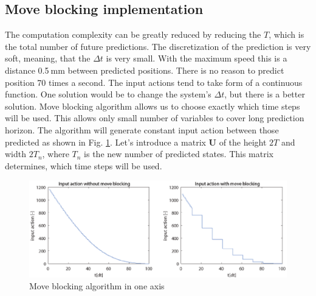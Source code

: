 \documentclass[a4paper,11pt,titlepage]{article}
\newcommand{\jed}[1]{\ensuremath{~\mathrm{#1}}}
\begin{document}
\subsection{Move blocking implementation}
The computation complexity can be greatly reduced by reducing the $T$, which is the total number of future predictions. The discretization of the prediction is very soft, meaning, that the $\Delta t$ is very small. With the maximum speed this is a distance 0.5\jed{mm} between predicted positions. There is no reason to predict position 70 times a second. The input actions tend to take form of a continuous function. One solution would be to change the system's $\Delta t$, but there is a better solution. Move blocking algorithm allows us to choose exactly which time steps will be used. This allows only small number of variables to cover long prediction horizon. The algorithm will generate constant input action between those predicted as shown in Fig. \ref{fig:move_blocking}. Let's introduce a matrix $\textbf{U}$ of the height $2T$ and width $2T_n$, where $T_n$ is the new number of predicted states. This matrix determines, which time steps will be used.

\begin{figure}[h]
\includegraphics[width=1\textwidth]{fig/move_blocking_u.eps}
\caption{Move blocking algorithm in one axis}
\label{fig:move_blocking}
\end{figure}
\end{document}
